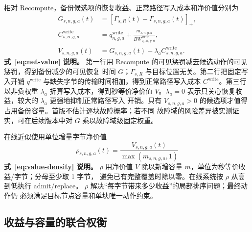 \documentclass[UTF8,11pt,a4paper,fontset=fandol]{ctexart}
\newcommand{\pos}[1]{\left[#1\right]_+}
\newcommand{\Recompute}{R}
\begin{document}
相对 Recompute，备份候选项的恢复收益、正常路径写入成本和净价值分别为
\begin{equation}
  \begin{aligned}
    G_{s,n,g,a}(t)
      &=\pos{\Gamma_{s,\Recompute}(t)-\Gamma_{s,n,g,a}(t)},\\
    C_{s,n,g,a}^{\mathrm{write}}
      &=q_{n,g,a}^{\mathrm{write}}
        +\frac{m_{s,n,g,a}}{BW_{o_s,n,g,a}^{\mathrm{write}}},\\
    V_{s,n,g,a}(t)
      &=G_{s,n,g,a}(t)
        -\lambda_a C_{s,n,g,a}^{\mathrm{write}}.
  \end{aligned}
  \label{eq:net-value}
\end{equation}
\noindent\textbf{式~\eqref{eq:net-value} 说明。}
第一行用 Recompute 的可见惩罚减去候选动作的可见惩罚，得到备份减少的可见恢复
时间 $G$；$\Gamma_{s,\Recompute}$ 与目标位置无关。第二行把固定写入开销
$q^{\mathrm{write}}$ 与缺失字节的传输时间相加，得到正常路径写入成本
$C^{\mathrm{write}}$。第三行以非负权重 $\lambda_a$ 折算写入成本，得到秒等价净价值
$V$。$\lambda_a=0$ 表示只关心恢复收益，较大的 $\lambda_a$ 更强地抑制正常路径写入
开销。只有 $V_{s,n,g,a}>0$ 的候选项才值得占用备份容量。首版不估计逐块故障概率；若不同
故障域的风险差异被实测证实，可在后续版本中对 $G$ 乘以故障域级固定权重。

在线近似使用单位增量字节净价值
\begin{equation}
  \rho_{s,n,g,a}(t)
  =
  \frac{V_{s,n,g,a}(t)}
       {\max(m_{s,n,g,a},1)}
  \label{eq:value-density}
\end{equation}
\noindent\textbf{式~\eqref{eq:value-density} 说明。}
$\rho$ 用净价值 $V$ 除以新增容量 $m$，单位为秒等价收益/字节；分母至少取 1 字节，
避免已有完整覆盖时除以零。在线系统按 $\rho$ 从高到低执行 admit/replace。
$\rho$ 解决“每字节带来多少收益”的局部排序问题；最终动作仍
必须满足目标节点容量和单块唯一动作约束。

\subsection{收益与容量的联合权衡}
\end{document}
